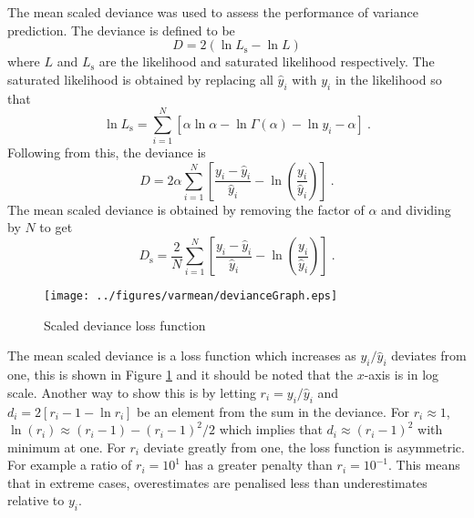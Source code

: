 The mean scaled deviance was used to assess the performance of variance prediction. The deviance is defined to be
\begin{equation}
  D = 2\left(
    \ln L_\mathrm{s} - \ln L
  \right)
\end{equation}
where $L$ and $L_\mathrm{s}$ are the likelihood and saturated likelihood respectively.  The saturated likelihood is obtained by replacing all $\widehat{y}_i$ with $y_i$ in the likelihood so that
\begin{equation}
  \ln L_\mathrm{s} = \sum_{i=1}^N \left[
    \alpha\ln\alpha
    -\ln\Gamma(\alpha)
    -\ln y_i
    -\alpha
  \right]
  \ .
\end{equation}
Following from this, the deviance is
\begin{equation}
  D = 2\alpha
  \sum_{i=1}^N\left[
      \dfrac{
          y_i-\widehat{y}_i
      }
      {
          \widehat{y}_i
      }
      - \ln\left(\dfrac{y_i}{\widehat{y}_i}\right)
  \right]
  \ .
\end{equation}
The mean scaled deviance is obtained by removing the factor of $\alpha$ and dividing by $N$ to get
\begin{equation}
    D_\mathrm{s} = \dfrac{2}{N}
    \sum_{i=1}^N\left[
        \dfrac{
            y_i-\widehat{y}_i
        }
        {
            \widehat{y}_i
        }
        - \ln\left(\dfrac{y_i}{\widehat{y}_i}\right)
    \right]
    \ .
\end{equation}

\begin{figure}
  \centering
  \texttt{[image: ../figures/varmean/devianceGraph.eps]}
  \caption{Scaled deviance loss function}
  \label{fig:meanVar_deviance}
\end{figure}

The mean scaled deviance is a loss function which increases as $y_i/\widehat{y}_i$ deviates from one, this is shown in Figure \ref{fig:meanVar_deviance} and it should be noted that the $x$-axis is in log scale. Another way to show this is by letting $r_i = y_i/\widehat{y}_i$ and $d_i = 2\left[r_i-1-\ln r_i\right]$ be an element from the sum in the deviance. For $r_i\approx 1$, $\ln(r_i)\approx(r_i-1)-(r_i-1)^2/2$ which implies that $d_i\approx (r_i-1)^2$ with minimum at one. For $r_i$ deviate greatly from one, the loss function is asymmetric. For example a ratio of $r_i=10^1$ has a greater penalty than $r_i=10^{-1}$. This means that in extreme cases, overestimates are penalised less than underestimates relative to $y_i$. 

